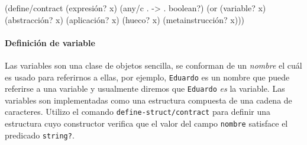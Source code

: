 \documentclass[10pt,oneside,openany,letterpaper]{book}
\begin{document}
\endmoddef
(define/contract (expresión? x)
  (any/c . -> . boolean?)
  (or (variable? x) (abstracción? x) (aplicación? x)
      (hueco? x) (metainstrucción? x)))
\eatline
{}\nwendcode{}\nwdocspar

\paragraph{Definición de variable} Las variables son una clase de objetos sencilla, se conforman de un \emph{nombre} el cuál es usado para referirnos a ellas, por ejemplo, {\tt{}Eduardo} es un nombre que puede referirse a una variable y usualmente diremos que {\tt{}Eduardo} \emph{es} la variable. Las variables son implementadas como una estructura compuesta de una cadena de caracteres. Utilizo el comando {\tt{}define-struct/contract} para definir una estructura cuyo constructor verifica que el valor del campo {\tt{}nombre} satisface el predicado {\tt{}string?}.
\end{document}
